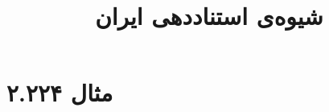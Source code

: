\documentclass[a4paper,10pt]{article}
\begin{document}
\title{شیوه‌ی استناددهی ایران}
\author{}
\date{}
\maketitle



\section*{مثال ۲.۲۲۴}

\cite{پاکباز1378}\\
\\






\end{document}
